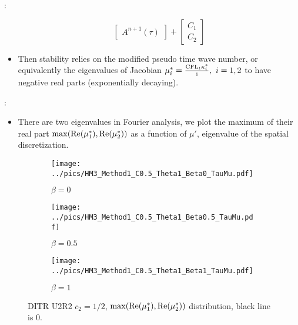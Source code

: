 \documentclass[aspectratio=169,serif]{beamer} %
\begin{document}
\begin{frame}{\secname: \subsecname}
\begin{itemize}
\begin{equation}
\begin{bmatrix}
              A^{n+1}(\tau)
            \end{bmatrix}
            +
            \begin{bmatrix}
              C_1 \\C_2
            \end{bmatrix}
          \end{equation}
          \normalsize
    \item Then stability relies on the modified pseudo time wave number, or equivalently
          the eigenvalues of Jacobian
          $\mu^*_i = \frac{\CFLt\kappa^*_i}{\imagUnit},\ i=1,2$ to have negative
          real parts (exponentially decaying).
  \end{itemize}
\end{frame}

\begin{frame}{\secname: \subsecname}
  \begin{itemize}
    \item There are two eigenvalues in Fourier analysis,
          we plot the maximum of their real part $\max(\mathrm{Re}(\mu^*_1),\mathrm{Re}(\mu^*_2))$
          as a function of $\mu'$, eigenvalue of the spatial discretization.
  \end{itemize}
  \begin{figure}[htbp]
    \centering
    \begin{subfigure}{0.28\textwidth}
      \texttt{[image: ../pics/HM3\_Method1\_C0.5\_Theta1\_Beta0\_TauMu.pdf]}
      \caption[]{$\beta = 0$}
    \end{subfigure}\hfill
    \begin{subfigure}{0.28\textwidth}
      \texttt{[image: ../pics/HM3\_Method1\_C0.5\_Theta1\_Beta0.5\_TauMu.pdf]}
      \caption[]{$\beta = 0.5$}
    \end{subfigure}\hfill
    \begin{subfigure}{0.28\textwidth}
      \texttt{[image: ../pics/HM3\_Method1\_C0.5\_Theta1\_Beta1\_TauMu.pdf]}
      \caption[]{$\beta = 1$}
    \end{subfigure}
    \caption{DITR U2R2 $c_2=1/2$, 
    $\max(\mathrm{Re}(\mu^*_1),\mathrm{Re}(\mu^*_2))$ distribution, black line is 0.}
    \label{fig:MuU2R2}
  \end{figure}
\end{frame}
\end{document}
